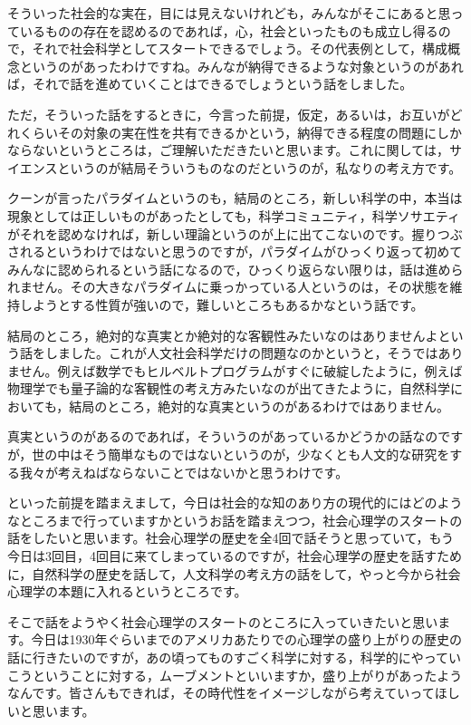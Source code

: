 \documentclass{ltjsbook}
\begin{document}
そういった社会的な実在，目には見えないけれども，みんながそこにあると思っているものの存在を認めるのであれば，心，社会といったものも成立し得るので，それで社会科学としてスタートできるでしょう。その代表例として，構成概念というのがあったわけですね。みんなが納得できるような対象というのがあれば，それで話を進めていくことはできるでしょうという話をしました。

ただ，そういった話をするときに，今言った前提，仮定，あるいは，お互いがどれくらいその対象の実在性を共有できるかという，納得できる程度の問題にしかならないというところは，ご理解いただきたいと思います。これに関しては，サイエンスというのが結局そういうものなのだというのが，私なりの考え方です。

クーンが言ったパラダイムというのも，結局のところ，新しい科学の中，本当は現象としては正しいものがあったとしても，科学コミュニティ，科学ソサエティがそれを認めなければ，新しい理論というのが上に出てこないのです。握りつぶされるというわけではないと思うのですが，パラダイムがひっくり返って初めてみんなに認められるという話になるので，ひっくり返らない限りは，話は進められません。その大きなパラダイムに乗っかっている人というのは，その状態を維持しようとする性質が強いので，難しいところもあるかなという話です。

結局のところ，絶対的な真実とか絶対的な客観性みたいなのはありませんよという話をしました。これが人文社会科学だけの問題なのかというと，そうではありません。例えば数学でもヒルベルトプログラムがすぐに破綻したように，例えば物理学でも量子論的な客観性の考え方みたいなのが出てきたように，自然科学においても，結局のところ，絶対的な真実というのがあるわけではありません。

真実というのがあるのであれば，そういうのがあっているかどうかの話なのですが，世の中はそう簡単なものではないというのが，少なくとも人文的な研究をする我々が考えねばならないことではないかと思うわけです。

といった前提を踏まえまして，今日は社会的な知のあり方の現代的にはどのようなところまで行っていますかというお話を踏まえつつ，社会心理学のスタートの話をしたいと思います。社会心理学の歴史を全4回で話そうと思っていて，もう今日は3回目，4回目に来てしまっているのですが，社会心理学の歴史を話すために，自然科学の歴史を話して，人文科学の考え方の話をして，やっと今から社会心理学の本題に入れるというところです。

そこで話をようやく社会心理学のスタートのところに入っていきたいと思います。今日は1930年ぐらいまでのアメリカあたりでの心理学の盛り上がりの歴史の話に行きたいのですが，あの頃ってものすごく科学に対する，科学的にやっていこうということに対する，ムーブメントといいますか，盛り上がりがあったようなんです。皆さんもできれば，その時代性をイメージしながら考えていってほしいと思います。
\end{document}
